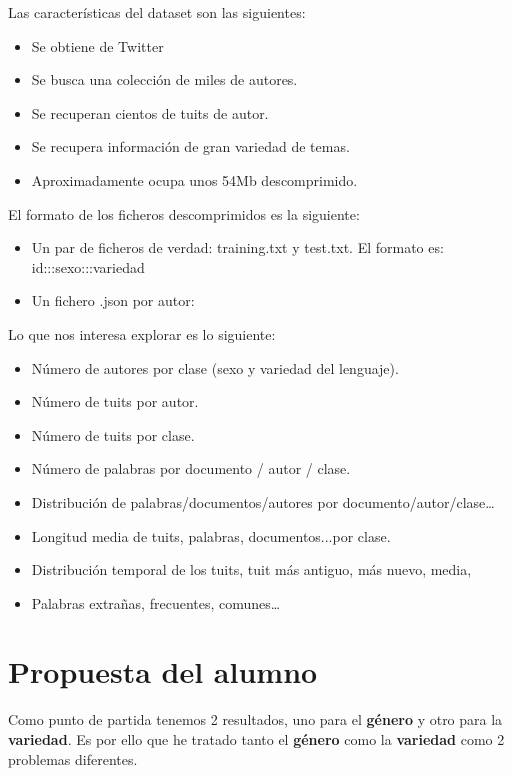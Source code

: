 \documentclass[11pt,a4paper]{article}
\begin{document}
Las caracter\'isticas del dataset son las siguientes:
\begin{itemize}
 \item Se obtiene de Twitter
 \item Se busca una colecci\'on de miles de autores.
 \item Se recuperan cientos de tuits de autor.
 \item Se recupera informaci\'on de gran variedad de temas.
 \item Aproximadamente ocupa unos 54Mb descomprimido.
\end{itemize}

El formato de los ficheros descomprimidos es la siguiente:
\begin{itemize}
 \item 	Un par de ficheros de verdad: training.txt y test.txt. El formato es:
 id:::sexo:::variedad
 \item Un fichero .json por autor:
\end{itemize}

Lo que nos interesa explorar es lo siguiente:
\begin{itemize}
 \item N\'umero de autores por clase (sexo y variedad del lenguaje).
 \item N\'umero de tuits por autor.
 \item N\'umero de tuits por clase.
 \item N\'umero de palabras por documento / autor / clase.
 \item Distribuci\'on de palabras/documentos/autores por documento/autor/clase…
 \item Longitud media de tuits, palabras, documentos...por clase.
 \item Distribuci\'on temporal de los tuits, tuit m\'as antiguo, m\'as nuevo, media,
 \item Palabras extra\~nas, frecuentes, comunes…
\end{itemize}

\section{Propuesta del alumno}

Como punto de partida tenemos 2 resultados, uno para el \textbf{\textbf{g\'enero}} y otro para la \textbf{variedad}. Es por ello que he tratado tanto el \textbf{\textbf{g\'enero}} como la \textbf{variedad} como 2 problemas diferentes.\newline
\end{document}

